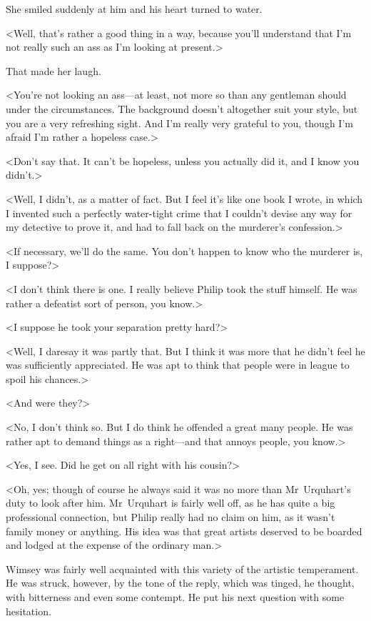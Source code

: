 She smiled suddenly at him and his heart turned to water.

<Well, that's rather a good thing in a way, because you'll understand that I'm not really such an ass as I'm looking at present.>

That made her laugh.

<You're not looking an ass—at least, not more so than any gentleman should under the circumstances. The background doesn't altogether suit your style, but you are a very refreshing sight. And I'm really very grateful to you, though I'm afraid I'm rather a hopeless case.>

<Don't say that. It can't be hopeless, unless you actually did it, and I know you didn't.>

<Well, I didn't, as a matter of fact. But I feel it's like one book I wrote, in which I invented such a perfectly water-tight crime that I couldn't devise any way for my detective to prove it, and had to fall back on the murderer's confession.>

<If necessary, we'll do the same. You don't happen to know who the murderer is, I suppose?>

<I don't think there is one. I really believe Philip took the stuff himself. He was rather a defeatist sort of person, you know.>

<I suppose he took your separation pretty hard?>

<Well, I daresay it was partly that. But I think it was more that he didn't feel he was sufficiently appreciated. He was apt to think that people were in league to spoil his chances.>

<And were they?>

<No, I don't think so. But I do think he offended a great many people. He was rather apt to demand things as a right—and that annoys people, you know.>

<Yes, I see. Did he get on all right with his cousin?>

<Oh, yes; though of course he always said it was no more than Mr~Urquhart's duty to look after him. Mr~Urquhart is fairly well off, as he has quite a big professional connection, but Philip really had no claim on him, as it wasn't family money or anything. His idea was that great artists deserved to be boarded and lodged at the expense of the ordinary man.>

Wimsey was fairly well acquainted with this variety of the artistic temperament. He was struck, however, by the tone of the reply, which was tinged, he thought, with bitterness and even some contempt. He put his next question with some hesitation.


